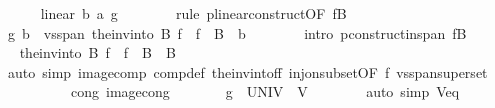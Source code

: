 \begin{isabellebody}
\ \ \ \ \isamarkupfalse%
\ {\isachardoublequoteopen}linear\ {\isacharparenleft}{\kern0pt}{\isacharasterisk}{\kern0pt}b{\isacharparenright}{\kern0pt}\ {\isacharparenleft}{\kern0pt}{\isacharasterisk}{\kern0pt}a{\isacharparenright}{\kern0pt}\ {\isacharquery}{\kern0pt}g{\isachardoublequoteclose}\isanewline
\ \ \ \ \ \ \isamarkupfalse%
\ {\isacharparenleft}{\kern0pt}rule\ p{\isachardot}{\kern0pt}linear{\isacharunderscore}{\kern0pt}construct{\isacharbrackleft}{\kern0pt}OF\ fB{\isacharbrackright}{\kern0pt}{\isacharparenright}{\kern0pt}\isanewline
\ \ \ \ \isamarkupfalse%
\ {\isachardoublequoteopen}{\isacharquery}{\kern0pt}g\ b\ {\isasymin}\ vs{}{\isachardot}{\kern0pt}span\ {\isacharparenleft}{\kern0pt}the{\isacharunderscore}{\kern0pt}inv{\isacharunderscore}{\kern0pt}into\ B\ f\ {\isacharbackquote}{\kern0pt}\ f\ {\isacharbackquote}{\kern0pt}\ B{\isacharparenright}{\kern0pt}{\isachardoublequoteclose}\ \ b\isanewline
\ \ \ \ \ \ \isamarkupfalse%
\ {\isacharparenleft}{\kern0pt}intro\ p{\isachardot}{\kern0pt}construct{\isacharunderscore}{\kern0pt}in{\isacharunderscore}{\kern0pt}span\ fB{\isacharparenright}{\kern0pt}\isanewline
\ \ \ \ \isamarkupfalse%
\ \isamarkupfalse%
\ {\isachardoublequoteopen}the{\isacharunderscore}{\kern0pt}inv{\isacharunderscore}{\kern0pt}into\ B\ f\ {\isacharbackquote}{\kern0pt}\ f\ {\isacharbackquote}{\kern0pt}\ B\ {\isacharequal}{\kern0pt}\ B{\isachardoublequoteclose}\isanewline
\ \ \ \ \ \ \isamarkupfalse%
\ {\isacharparenleft}{\kern0pt}auto\ simp{\isacharcolon}{\kern0pt}\ image{\isacharunderscore}{\kern0pt}comp\ comp{\isacharunderscore}{\kern0pt}def\ the{\isacharunderscore}{\kern0pt}inv{\isacharunderscore}{\kern0pt}into{\isacharunderscore}{\kern0pt}f{\isacharunderscore}{\kern0pt}f\ inj{\isacharunderscore}{\kern0pt}on{\isacharunderscore}{\kern0pt}subset{\isacharbrackleft}{\kern0pt}OF\ f\ vs{}{\isachardot}{\kern0pt}span{\isacharunderscore}{\kern0pt}superset{\isacharbrackright}{\kern0pt}\isanewline
\ \ \ \ \ \ \ \ \ \ cong{\isacharcolon}{\kern0pt}\ image{\isacharunderscore}{\kern0pt}cong{\isacharparenright}{\kern0pt}\isanewline
\ \ \ \ \isamarkupfalse%
\ \isamarkupfalse%
\ {\isachardoublequoteopen}{\isacharquery}{\kern0pt}g\ {\isacharbackquote}{\kern0pt}\ UNIV\ {\isasymsubseteq}\ V{\isachardoublequoteclose}\isanewline
\ \ \ \ \ \ \isamarkupfalse%
\ {\isacharparenleft}{\kern0pt}auto\ simp{\isacharcolon}{\kern0pt}\ V{\isacharunderscore}{\kern0pt}eq{\isacharparenright}{\kern0pt}\isanewline

\end{isabellebody}
